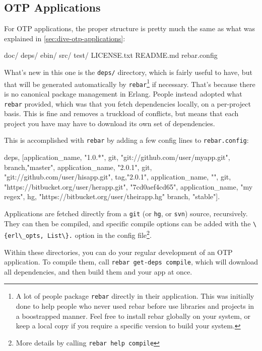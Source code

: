\documentclass[11pt, oneside]{book}   	%
\newcommand{\filename}[1]{\Verb`#1`}
\newcommand{\app}[1]{\Verb`#1`}
\newcommand{\expression}[1]{\Verb`#1`}
\newcommand{\command}[1]{\Verb`#1`}
\begin{document}
\subsection{OTP Applications}
\label{subsec:building-otp-applications}

For OTP applications, the proper structure is pretty much the same as what was explained in \ref{sec:dive-otp-applications}:

\begin{VerbatimText}
doc/
deps/
ebin/
src/
test/
LICENSE.txt
README.md
rebar.config
\end{VerbatimText}

What's new in this one is the \filename{deps/} directory, which is fairly useful to have, but that will be generated automatically by \app{rebar}\footnote{A lot of people package \app{rebar} directly in their application. This was initially done to help people who never used rebar before use libraries and projects in a boostrapped manner. Feel free to install rebar globally on your system, or keep a local copy if you require a specific version to build your system.} if necessary. That's because there is no canonical package management in Erlang. People instead adopted what \app{rebar} provided, which was that you fetch dependencies locally, on a per-project basis. This is fine and removes a truckload of conflicts, but means that each project you have may have to download its own set of dependencies.

This is accomplished with \app{rebar} by adding a few config lines to \filename{rebar.config}:

\begin{VerbatimText}
{deps,
 [{application_name, "1.0.*",
   {git, "git://github.com/user/myapp.git", {branch,"master"}}},
  {application_name, "2.0.1",
   {git, "git://github.com/user/hisapp.git", {tag,"2.0.1"}}},
  {application_name, "", 
   {git, "https://bitbucket.org/user/herapp.git",  "7cd0aef4cd65"}},
  {application_name, "my regex",
   {hg, "https://bitbucket.org/user/theirapp.hg" {branch, "stable"}}}]}.
\end{VerbatimText}

Applications are fetched directly from a \app{git} (or \app{hg}, or \app{svn}) source, recursively. They can then be compiled, and specific compile options can be added with the \expression{\{erl\_opts, List\}.} option in the config file\footnote{More details by calling \command{rebar help compile}}. 

Within these directories, you can do your regular development of an OTP application. To compile them, call \command{rebar get-deps compile}, which will download all dependencies, and then build them and your app at once.
\end{document}
